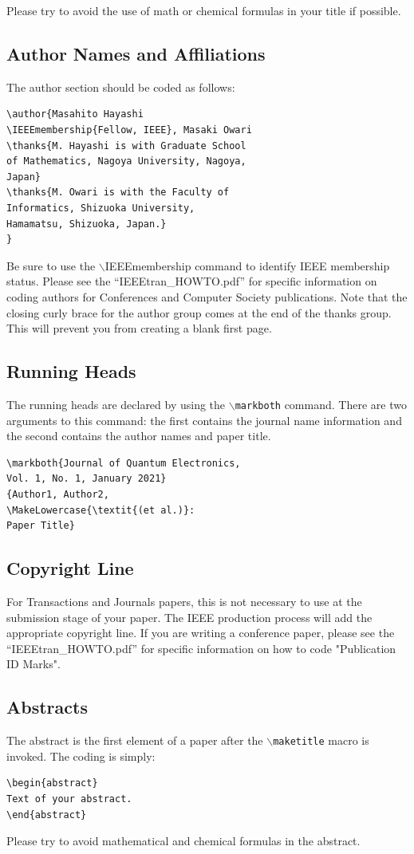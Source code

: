\documentclass[lettersize,journal]{IEEEtran} %
\begin{document}
\noindent Please try to avoid the use of math or chemical formulas in your title if possible.

\subsection{Author Names and Affiliations}
\noindent The author section should be coded as follows:
\begin{verbatim}
\author{Masahito Hayashi 
\IEEEmembership{Fellow, IEEE}, Masaki Owari
\thanks{M. Hayashi is with Graduate School 
of Mathematics, Nagoya University, Nagoya, 
Japan}
\thanks{M. Owari is with the Faculty of 
Informatics, Shizuoka University, 
Hamamatsu, Shizuoka, Japan.}
}
\end{verbatim}
Be sure to use the $\backslash$IEEEmembership command to identify IEEE membership status.
Please see the ``IEEEtran\_HOWTO.pdf'' for specific information on coding authors for Conferences and Computer Society publications. Note that the closing curly brace for the author group comes at the end of the thanks group. This will prevent you from creating a blank first page.

\subsection{Running Heads}
\noindent The running heads are declared by using the $\backslash${\tt{markboth}} command. There are two arguments to this command: the first contains the journal name information and the second contains the author names and paper title.
\begin{verbatim}
\markboth{Journal of Quantum Electronics, 
Vol. 1, No. 1, January 2021}
{Author1, Author2, 
\MakeLowercase{\textit{(et al.)}: 
Paper Title}
\end{verbatim}

\subsection{Copyright Line}
\noindent For Transactions and Journals papers, this is not necessary to use at the submission stage of your paper. The IEEE production process will add the appropriate copyright line. If you are writing a conference paper, please see the ``IEEEtran\_HOWTO.pdf'' for specific information on how to code "Publication ID Marks".

\subsection{Abstracts}
\noindent The abstract is the first element of a paper after the $\backslash${\tt{maketitle}} macro is invoked.  The coding is simply:
\begin{verbatim}
\begin{abstract}
Text of your abstract.
\end{abstract}
\end{verbatim}
Please try to avoid mathematical and chemical formulas in the abstract.
\end{document}
